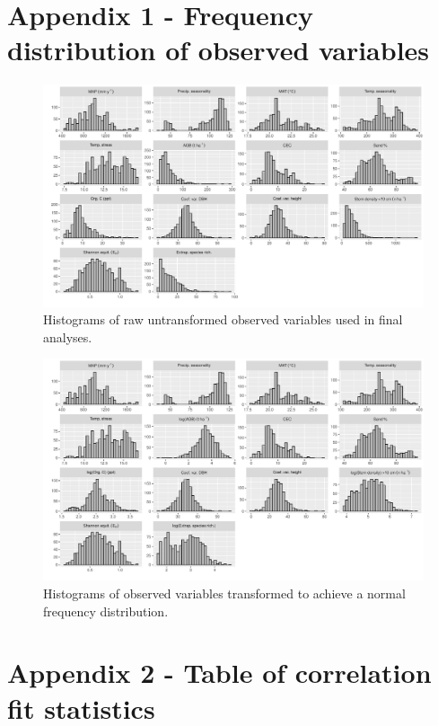 \documentclass[11pt,a4paper]{article}
\begin{document}
\section{Appendix 1 - Frequency distribution of observed variables} \label{appendixa}

\begin{figure}[H]
\centering
	\includegraphics[width=\textwidth]{hist_raw}
	\caption{Histograms of raw untransformed observed variables used in final analyses.}
	\label{hist_raw}
\end{figure}

\begin{figure}[H]
\centering
	\includegraphics[width=\textwidth]{hist_trans}
	\caption{Histograms of observed variables transformed to achieve a normal frequency distribution.}
	\label{hist_trans}
\end{figure}

\section{Appendix 2 - Table of correlation fit statistics} \label{appendixb}
\end{document}

